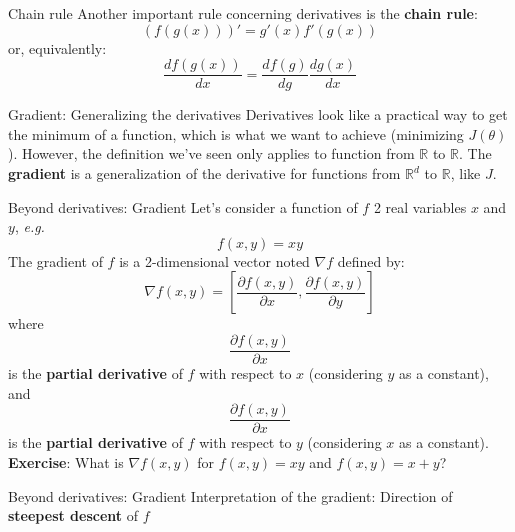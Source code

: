 \documentclass{beamer}
\newcommand{\real}{\mathbb{R}}
\newcommand{\1}[1]{\mathbbm{1}\left[#1\right]}
\begin{document}
\begin{frame}{Chain rule}
Another important rule concerning derivatives is the \textbf{chain rule}:
\begin{equation}
	(f(g(x)))' = g'(x) f'(g(x))
\end{equation}
or, equivalently:
\begin{equation}
	\dfrac{df(g(x))}{dx} = \dfrac{df(g)}{dg} \dfrac{dg(x)}{dx}
\end{equation}
\end{frame}

\begin{frame}{Gradient: Generalizing the derivatives}
Derivatives look like a practical way to get the minimum of a function, which is what we want to achieve (minimizing $J(\theta)$).
\vfill
\pause
However, the definition we've seen only applies to function from $\real$ to $\real$. The \textbf{gradient} is a generalization of the derivative for functions from $\real^d$ to $\real$, like $J$.
\end{frame}

\begin{frame}{Beyond derivatives: Gradient}
Let's consider a function of $f$ 2 real variables $x$ and $y$, \textit{e.g.}
\begin{equation*}
f(x, y) = xy
\end{equation*}
The gradient of $f$ is a 2-dimensional vector noted $\nabla f$ defined by:
\begin{equation*}
\nabla f(x, y) = \left[ \dfrac{\partial f(x, y)}{\partial x}, \dfrac{\partial f(x, y)}{\partial y} \right]
\end{equation*}
where 
$$\dfrac{\partial f(x, y)}{\partial x}$$ 
is the \textbf{partial derivative} of $f$ with respect to $x$ (considering $y$ as a constant), and 
$$\dfrac{\partial f(x, y)}{\partial x}$$ 
is the \textbf{partial derivative} of $f$ with respect to $y$ (considering $x$ as a constant).
\vfill
\pause
\textbf{Exercise}: What is $\nabla f(x, y)$ for $f(x, y) = xy$ and $f(x, y) = x + y$?
\end{frame}

\begin{frame}{Beyond derivatives: Gradient}
Interpretation of the gradient: Direction of \textbf{steepest descent} of $f$
\end{frame}
\end{document}
